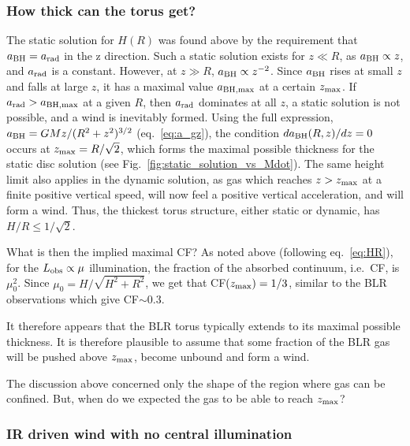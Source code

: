 \documentclass[a4paper,fleqn,usenatbib]{mnras}
\begin{document}
\subsubsection{How thick can the torus get?}

The static solution for $H(R)$ was found above by the requirement that $a_{\rm BH}=a_{\rm rad}$
in the z direction. Such a static solution exists for $z\ll R$, as $a_{\rm BH}\propto z$, 
and $a_{\rm rad}$ is a constant. However, at $z\gg R$, $a_{\rm BH}\propto z^{-2}$. Since
$a_{\rm BH}$ rises at small $z$ and falls at large $z$, it has a maximal value
$a_{\rm BH, max}$ at a certain $z_{\rm max}$. If $a_{\rm rad}>a_{\rm BH, max}$ at a given $R$, 
then $a_{\rm rad}$ dominates at all $z$, a static solution is not possible, and a wind is 
inevitably formed.
Using the full expression, $a_{\rm BH}=GMz/(R^2+z^2)^{3/2}$ (eq.~\ref{eq:a_gz}),
the condition $da_{\rm BH}(R,z)/dz=0$ occurs at $z_{\rm max}=R/\sqrt{2}$, which forms
the maximal possible thickness for the static disc solution (see Fig.~\ref{fig:static_solution_vs_Mdot}).
The same height limit also applies in the dynamic solution, as gas which reaches 
$z>z_{\rm max}$ at a finite positive vertical speed, will now feel
a positive vertical acceleration, and will form a wind. 
Thus, the thickest torus structure, either static or dynamic, has $H/R\le 1/\sqrt{2}$.

What is then the implied maximal CF? As noted above (following eq.~\ref{eq:HR}), for the 
$L_{\rm obs}\propto \mu$ illumination, the fraction of the absorbed continuum, i.e.\ CF, 
is $\mu_0^2$. Since $\mu_0=H/\sqrt{H^2+R^2}$, we get that CF$(z_{\rm max})=1/3$,
similar to the BLR observations which give CF$\sim 0.3$.

It therefore appears that the BLR torus typically extends to its maximal possible thickness. 
It is therefore plausible to assume that some fraction of the BLR gas will be pushed
above $z_{\rm max}$, become unbound and form a wind. 

The discussion above concerned only the shape of the region where gas can be confined. 
But, when do we expected the gas to be able to reach $z_{\rm max}$?




\subsubsection{IR driven wind with no central illumination}
\end{document}
